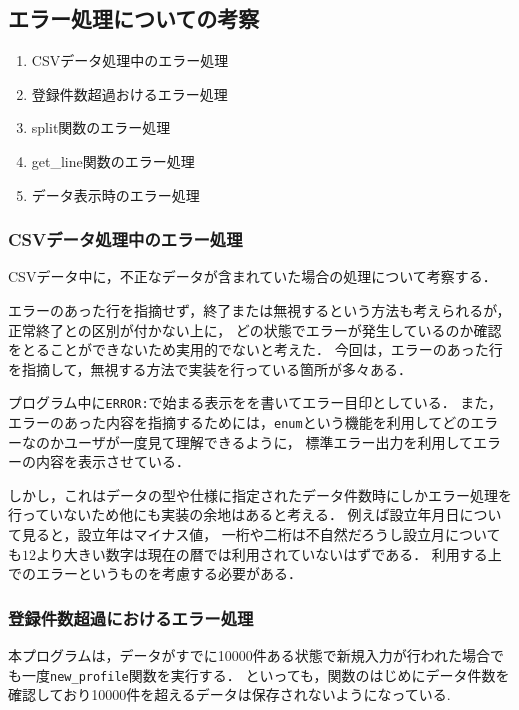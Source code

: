 \documentclass[a4j,11pt]{jarticle}
\begin{document}
\subsection{エラー処理についての考察}
\begin{enumerate}
\setlength{\parskip}{2pt} \setlength{\itemsep}{2pt}
    \item CSVデータ処理中のエラー処理
    \item 登録件数超過おけるエラー処理
    \item split関数のエラー処理
    \item get\_line関数のエラー処理
    \item データ表示時のエラー処理
\end{enumerate}


\subsubsection{CSVデータ処理中のエラー処理}

CSVデータ中に，不正なデータが含まれていた場合の処理について考察する．

エラーのあった行を指摘せず，終了または無視するという方法も考えられるが，正常終了との区別が付かない上に，
どの状態でエラーが発生しているのか確認をとることができないため実用的でないと考えた．
今回は，エラーのあった行を指摘して，無視する方法で実装を行っている箇所が多々ある．

プログラム中に\verb|ERROR:|で始まる表示をを書いてエラー目印としている．
また，エラーのあった内容を指摘するためには，\verb|enum|という機能を利用してどのエラーなのかユーザが一度見て理解できるように，
標準エラー出力を利用してエラーの内容を表示させている．

しかし，これはデータの型や仕様に指定されたデータ件数時にしかエラー処理を行っていないため他にも実装の余地はあると考える．
例えば設立年月日について見ると，設立年はマイナス値，
一桁や二桁は不自然だろうし設立月についても$12$より大きい数字は現在の暦では利用されていないはずである．
利用する上でのエラーというものを考慮する必要がある．

\subsubsection{登録件数超過におけるエラー処理}
本プログラムは，データがすでに10000件ある状態で新規入力が行われた場合でも一度\verb|new_profile|関数を実行する．
といっても，関数のはじめにデータ件数を確認しており10000件を超えるデータは保存されないようになっている.
\end{document}
